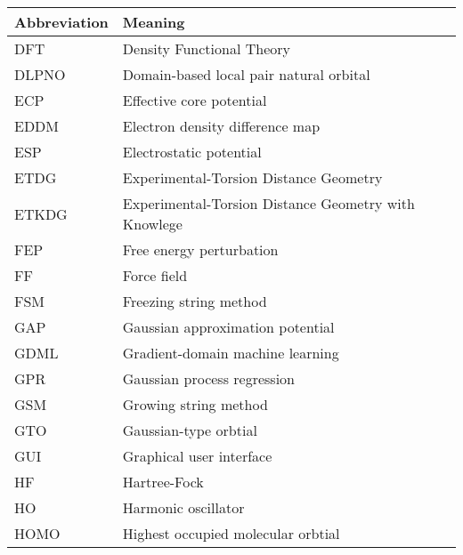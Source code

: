 \documentclass[main.tex]{subfiles}
\begin{document}
\begin{table}[h!]
\def\arraystretch{2.0}
\begin{tabularx}{\textwidth}{YY}
Abbreviation & Meaning \\
\hline
DFT	&	Density Functional Theory	\\
DLPNO	&	Domain-based local pair natural orbital	\\
ECP	&	Effective core potential	\\
EDDM	&	Electron density difference map	\\
ESP	&	Electrostatic potential	\\
ETDG	&	Experimental-Torsion Distance Geometry	\\
ETKDG	&	Experimental-Torsion Distance Geometry with Knowlege	\\
FEP	&	Free energy perturbation	\\
FF	&	Force field	\\
FSM	&	Freezing string method	\\
GAP	&	Gaussian approximation potential	\\
GDML	&	Gradient-domain machine learning	\\
GPR	&	Gaussian process regression	\\
GSM	&	Growing string method	\\
GTO	&	Gaussian-type orbtial	\\
GUI	&	Graphical user interface	\\
HF	&	Hartree-Fock	\\
HO	&	Harmonic oscillator	\\
HOMO	&	Highest occupied molecular orbtial	\\
\end{tabularx}
\end{table}
\newpage
\end{document}
